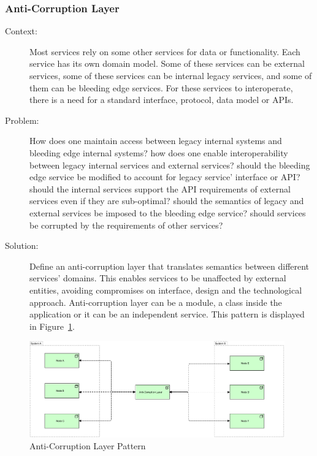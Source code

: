 \documentclass{bmcart}
\begin{document}
\subsubsection{Anti-Corruption Layer}

\begin{description}
  \item[Context:] Most services rely on some other services for data or functionality. Each service has its own domain model. Some of these services can be external services, some of these services can be internal legacy services, and some of them can be bleeding edge services. For these services to interoperate, there is a need for a standard interface, protocol, data model or APIs.  
  \item[Problem:] How does one maintain access between legacy internal systems and bleeding edge internal systems? how does one enable interoperability between legacy internal services and external services? should the bleeding edge service be modified to account for legacy service' interface or API? should the internal services support the API requirements of external services even if they are sub-optimal? should the semantics of legacy and external services be imposed to the bleeding edge service? should services be corrupted by the requirements of other services?  
  \item[Solution:] Define an anti-corruption layer that translates semantics between different services' domains. This enables services to be unaffected by external entities, avoiding compromises on interface, design and the technological approach. Anti-corruption layer can be a module, a class inside the application or it can be an independent service. This pattern is displayed in Figure~\ref{antiCorruption}.    
\end{description}


\begin{figure}[h]
  \includegraphics[width=11cm]{Media/Anti-Corruption Layer.jpg}
  \caption{Anti-Corruption Layer Pattern}
  \label{antiCorruption}
\end{figure}
\end{document}

